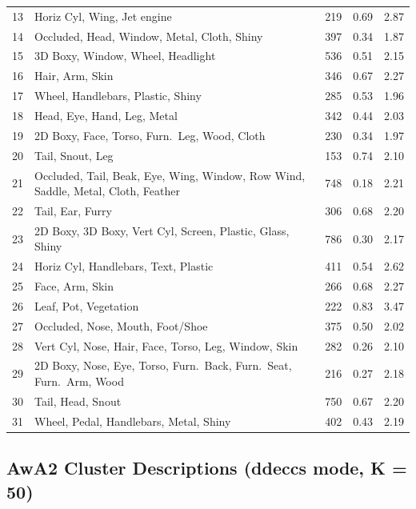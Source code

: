 \begin{table}[H]
{\begin{tabular}{clccc}
            13 & Horiz Cyl, Wing, Jet engine & 219 & 0.69 & 2.87 \\
            14 & Occluded, Head, Window, Metal, Cloth, Shiny & 397 & 0.34 & 1.87 \\
            15 & 3D Boxy, Window, Wheel, Headlight & 536 & 0.51 & 2.15 \\
            16 & Hair, Arm, Skin & 346 & 0.67 & 2.27 \\
            17 & Wheel, Handlebars, Plastic, Shiny & 285 & 0.53 & 1.96 \\
            18 & Head, Eye, Hand, Leg, Metal & 342 & 0.44 & 2.03 \\
            19 & 2D Boxy, Face, Torso, Furn.\ Leg, Wood, Cloth & 230 & 0.34 & 1.97 \\
            20 & Tail, Snout, Leg & 153 & 0.74 & 2.10 \\
            21 & Occluded, Tail, Beak, Eye, Wing, Window, Row Wind, Saddle, Metal, Cloth, Feather & 748 & 0.18 & 2.21 \\
            22 & Tail, Ear, Furry & 306 & 0.68 & 2.20 \\
            23 & 2D Boxy, 3D Boxy, Vert Cyl, Screen, Plastic, Glass, Shiny & 786 & 0.30 & 2.17 \\
            24 & Horiz Cyl, Handlebars, Text, Plastic & 411 & 0.54 & 2.62 \\
            25 & Face, Arm, Skin & 266 & 0.68 & 2.27 \\
            26 & Leaf, Pot, Vegetation & 222 & 0.83 & 3.47 \\
            27 & Occluded, Nose, Mouth, Foot/Shoe & 375 & 0.50 & 2.02 \\
            28 & Vert Cyl, Nose, Hair, Face, Torso, Leg, Window, Skin & 282 & 0.26 & 2.10 \\
            29 & 2D Boxy, Nose, Eye, Torso, Furn.\ Back, Furn.\ Seat, Furn.\ Arm, Wood & 216 & 0.27 & 2.18 \\
            30 & Tail, Head, Snout & 750 & 0.67 & 2.20 \\
            31 & Wheel, Pedal, Handlebars, Metal, Shiny & 402 & 0.43 & 2.19 \\
            \bottomrule
        \end{tabular}
    }
\end{table}


\subsection{AwA2 Cluster Descriptions (ddeccs mode, K = 50)}
\label{subsec:awa2_ddeccs}

